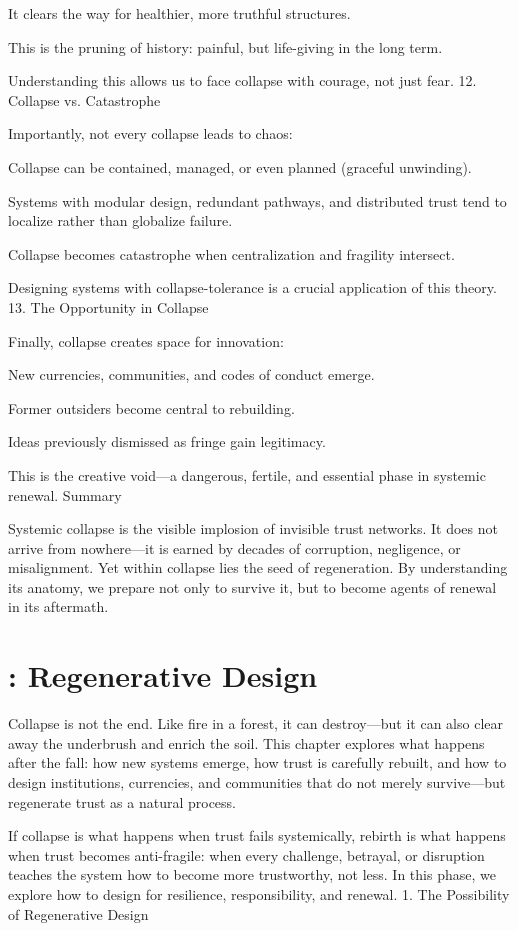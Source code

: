 \documentclass[11pt,oneside]{book}
\begin{document}
    It clears the way for healthier, more truthful structures.

    This is the pruning of history: painful, but life-giving in the long term.

Understanding this allows us to face collapse with courage, not just fear.
12. Collapse vs. Catastrophe

Importantly, not every collapse leads to chaos:

    Collapse can be contained, managed, or even planned (graceful unwinding).

    Systems with modular design, redundant pathways, and distributed trust tend to localize rather than globalize failure.

    Collapse becomes catastrophe when centralization and fragility intersect.

Designing systems with collapse-tolerance is a crucial application of this theory.
13. The Opportunity in Collapse

Finally, collapse creates space for innovation:

    New currencies, communities, and codes of conduct emerge.

    Former outsiders become central to rebuilding.

    Ideas previously dismissed as fringe gain legitimacy.

This is the creative void—a dangerous, fertile, and essential phase in systemic renewal.
Summary

Systemic collapse is the visible implosion of invisible trust networks. It does not arrive from nowhere—it is earned by decades of corruption, negligence, or misalignment. Yet within collapse lies the seed of regeneration. By understanding its anatomy, we prepare not only to survive it, but to become agents of renewal in its aftermath.


\chapter{: Regenerative Design}

Collapse is not the end. Like fire in a forest, it can destroy—but it can also clear away the underbrush and enrich the soil. This chapter explores what happens after the fall: how new systems emerge, how trust is carefully rebuilt, and how to design institutions, currencies, and communities that do not merely survive—but regenerate trust as a natural process.

If collapse is what happens when trust fails systemically, rebirth is what happens when trust becomes anti-fragile: when every challenge, betrayal, or disruption teaches the system how to become more trustworthy, not less. In this phase, we explore how to design for resilience, responsibility, and renewal.
1. The Possibility of Regenerative Design
\end{document}
